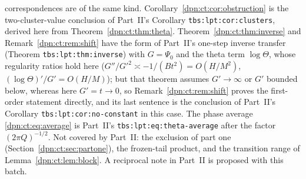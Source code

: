 \documentclass[11pt]{article}
\numberwithin{equation}{section}
\theoremstyle{definition}\newtheorem{definition}[theorem]{Definition}
\theoremstyle{remark}\newtheorem{remark}[theorem]{Remark}
\begin{document}
correspondences are of the same kind.  Corollary~\ref{dpn:ct:cor:obstruction}
is the two-cluster-value conclusion of Part~II's Corollary
\texttt{tbs:lpt:cor:clusters}, derived here from
Theorem~\ref{dpn:ct:thm:theta}.  Theorem~\ref{dpn:ct:thm:inverse} and
Remark~\ref{dpn:ct:rem:shift} have the form of Part~II's one-step inverse
transfer (Theorem \texttt{tbs:lpt:thm:inverse}) with $G=\Psi_0$ and the theta
term $\log\Theta$, whose regularity ratios hold here
($G''/G'^2\asymp-1/(Bt^2)=O(H/M^2)$, $(\log\Theta)'/G'=O(H/M)$); but that
theorem assumes $G'\to\infty$ or $G'$ bounded below, whereas here
$G'=t\to0$, so Remark~\ref{dpn:ct:rem:shift} proves the first-order statement
directly, and its last sentence is the conclusion of Part~II's Corollary
\texttt{tbs:lpt:cor:no-constant} in this case.  The phase average
\eqref{dpn:ct:eq:average} is Part~II's \texttt{tbs:lpt:eq:theta-average} after
the factor $(2\pi Q)^{-1/2}$.  Not covered by Part~II: the exclusion of part
one (Section~\ref{dpn:ct:sec:partone}), the frozen-tail product, and the
transition range of Lemma~\ref{dpn:ct:lem:block}.  A reciprocal note in
Part~II is proposed with this batch.

\end{document}
